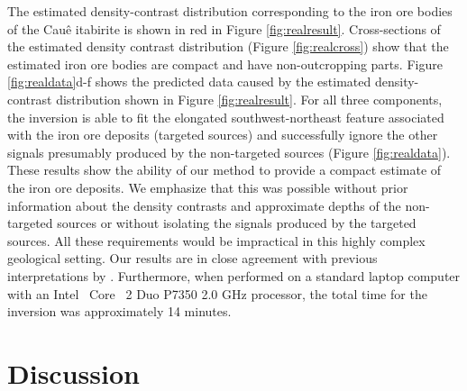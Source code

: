The estimated density-contrast distribution corresponding to
the iron ore bodies of the Cau\^{e} itabirite
is shown in red in Figure \ref{fig:realresult}.
Cross-sections of the estimated density contrast distribution (Figure
\ref{fig:realcross}) show
that the estimated iron ore bodies are compact and have non-outcropping parts.
Figure \ref{fig:realdata}d-f shows the predicted data caused by
the estimated density-contrast distribution shown in
Figure \ref{fig:realresult}.
For all three components, the inversion is able to fit the elongated
southwest-northeast feature associated with the iron ore deposits (targeted
sources) and successfully ignore the other signals presumably produced by the
non-targeted sources (Figure \ref{fig:realdata}).
These results show the ability of our method to provide a compact estimate of
the iron ore deposits.
We emphasize that this was possible without prior information about
the density contrasts and approximate depths of the non-targeted sources
or without isolating the signals produced by the targeted sources.
All these requirements would be impractical in this highly complex geological
setting.
Our results are in close agreement with previous interpretations by
\citet{martinez}.
Furthermore, when performed on a standard laptop computer with an
Intel\textregistered ~ Core\texttrademark ~ 2 Duo P7350 2.0 GHz processor, the
total time for the inversion was approximately 14 minutes.

\section{Discussion}

